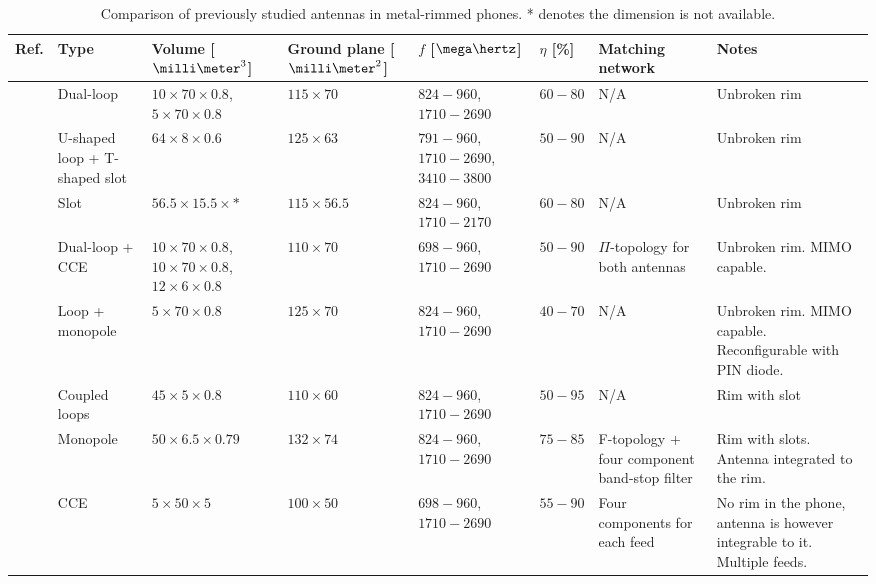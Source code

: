 \begin{table}
\centering
\vspace*{1cm}
\caption{Comparison of previously studied antennas in metal-rimmed phones. * denotes the dimension is not available.}
\label{tab:metal_rim_comp}
\begin{tabular}{|M{0.03\textheight}|M{0.11\textheight}|M{0.11\textheight}|M{0.11\textheight}|M{0.1\textheight}|M{0.06\textheight}|M{0.15\textheight}|>{\Centering\hspace*{0pt}}M{0.18\textheight}|}
    \hline
    \textbf{Ref.} & \textbf{Type} & \textbf{Volume [$\milli\meter^3$]} & \textbf{Ground plane [$\milli\meter^2$]} &\textbf{$f$ [$\mega\hertz$]} & \textbf{$\eta$ [\%]} & \textbf{Matching network} & \textbf{Notes}\\
    \hline
    \cite{ban_dual_loop} & Dual-loop & $10\times70\times0.8$, $5\times70\times0.8$ & $115\times70$ & $824-960$, $1710-2690$ & $60-80$ & N/A & Unbroken rim\\
    \hline
    \cite{hsu_compact} & U-shaped loop + T-shaped slot & $64\times8\times0.6$ & $125\times63$ & $791-960$, $1710-2690$, $3410-3800$ & $50-90$ & N/A & Unbroken rim\\
    \hline
    \cite{yuan_slot} & Slot & $56.5\times15.5\times*$ & $115\times56.5$ & $824-960$, $1710-2170$ & $60-80$ & N/A & Unbroken rim\\
    \hline
    \cite{stanley_lte_mimo} & Dual-loop + CCE & $10\times70\times0.8$, $10\times70\times0.8$, $12\times6\times0.8$ & $110\times70$ & $698-960$, $1710-2690$ & $50-90$ & $\Pi$-topology for both antennas & Unbroken rim. MIMO capable.\\
    \hline
    \cite{reconf_narrow} & Loop + monopole & $5\times70\times0.8$ & $125\times70$ & $824-960$, $1710-2690$ & $40-70$ & N/A & Unbroken rim. MIMO capable. Re\-con\-fi\-gu\-rable with PIN diode.\\
    \hline
    \cite{hybrid} & Coupled loops & $45\times5\times0.8$ & $110\times60$ & $824-960$, $1710-2690$ & $50-95$ & N/A & Rim with slot\\
    \hline
    \cite{lee_monopole} & Monopole & $50\times6.5\times0.79$ & $132\times74$ & $824-960$, $1710-2690$ & $75-85$ & F-topology + four component band-stop filter & Rim with slots. Antenna integrated to the rim.\\
    \hline
    \cite{valkonen_multifeed} & CCE & $5\times50\times5$ & $100\times50$ & $698-960$, $1710-2690$ & $55-90$ & Four components for each feed & No rim in the phone, antenna is however integrable to it. Multiple feeds.\\

\end{tabular}
\end{table}
